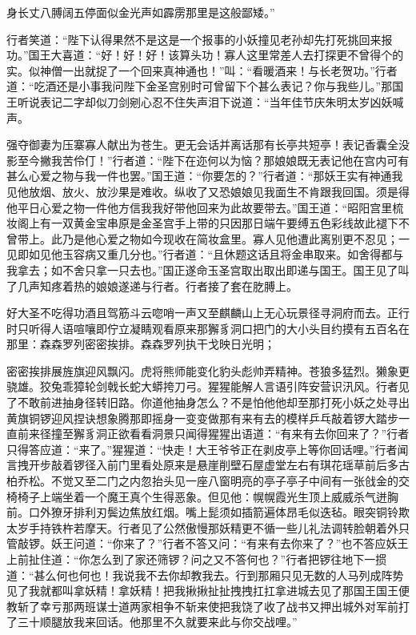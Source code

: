 \documentclass[12pt,UTF8]{ctexbook}
\begin{document}
身长丈八膊阔五停面似金光声如霹雳那里是这般鄙矮。”

行者笑道：“陛下认得果然不是这是一个报事的小妖撞见老孙却先打死挑回来报功。”国王大喜道：“好！好！好！该算头功！寡人这里常差人去打探更不曾得个的实。似神僧一出就捉了一个回来真神通也！”叫：“看暖酒来！与长老贺功。”行者道：“吃酒还是小事我问陛下金圣宫别时可曾留下个甚么表记？你与我些儿。”那国王听说表记二字却似刀剑剜心忍不住失声泪下说道：“当年佳节庆朱明太岁凶妖喊声。

强夺御妻为压寨寡人献出为苍生。更无会话并离话那有长亭共短亭！表记香囊全没影至今撇我苦伶仃！”行者道：“陛下在迩何以为恼？那娘娘既无表记他在宫内可有甚么心爱之物与我一件也罢。”国王道：“你要怎的？”行者道：“那妖王实有神通我见他放烟、放火、放沙果是难收。纵收了又恐娘娘见我面生不肯跟我回国。须是得他平日心爱之物一件他方信我我好带他回来为此故要带去。”国王道：“昭阳宫里梳妆阁上有一双黄金宝串原是金圣宫手上带的只因那日端午要缚五色彩线故此褪下不曾带上。此乃是他心爱之物如今现收在简妆盒里。寡人见他遭此离别更不忍见；一见即如见他玉容病又重几分也。”行者道：“且休题这话且将金串取来。如舍得都与我拿去；如不舍只拿一只去也。”国正遂命玉圣宫取出取出即递与国王。国王见了叫了几声知疼着热的娘娘遂递与行者。行者接了套在肐膊上。

好大圣不吃得功酒且驾筋斗云唿哨一声又至麒麟山上无心玩景径寻洞府而去。正行时只听得人语喧嚷即佇立凝睛观看原来那獬豸洞口把门的大小头目约摸有五百名在那里：森森罗列密密挨排。森森罗列执干戈映日光明；

密密挨排展旌旗迎风飘闪。虎将熊师能变化豹头彪帅弄精神。苍狼多猛烈。獭象更骁雄。狡兔乖獐轮剑戟长蛇大蟒挎刀弓。猩猩能解人言语引阵安营识汛风。行者见了不敢前进抽身径转旧路。你道他抽身怎么？不是怕他他却至那打死小妖之处寻出黄旗铜锣迎风捏诀想象腾那即摇身一变变做那有来有去的模样乒乓敲着锣大踏步一直前来径撞至獬豸洞正欲看看洞景只闻得猩猩出语道：“有来有去你回来了？”行者只得答应道：“来了。”猩猩道：“快走！大王爷爷正在剥皮亭上等你回话哩。”行者闻言拽开步敲着锣径入前门里看处原来是悬崖削壁石屋虚堂左右有琪花瑶草前后多古柏乔松。不觉又至二门之内忽抬头见一座八窗明亮的亭子亭子中间有一张戗金的交椅椅子上端坐着一个魔王真个生得恶象。但见他：幌幌霞光生顶上威威杀气迸胸前。口外獠牙排利刃鬓边焦放红烟。嘴上髭须如插箭遍体昂毛似迭毡。眼突铜铃欺太岁手持铁杵若摩天。行者见了公然傲慢那妖精更不循一些儿礼法调转脸朝着外只管敲锣。妖王问道：“你来了？”行者不答又问：“有来有去你来了？”也不答应妖王上前扯住道：“你怎么到了家还筛锣？问之又不答何也？”行者把锣往地下一掼道：“甚么何也何也！我说我不去你却教我去。行到那厢只见无数的人马列成阵势见了我就都叫拿妖精！拿妖精！把我揪揪扯扯拽拽扛扛拿进城去见了那国王国王便教斩了幸亏那两班谋士道两家相争不斩来使把我饶了收了战书又押出城外对军前打了三十顺腿放我来回话。他那里不久就要来此与你交战哩。”
\end{document}
